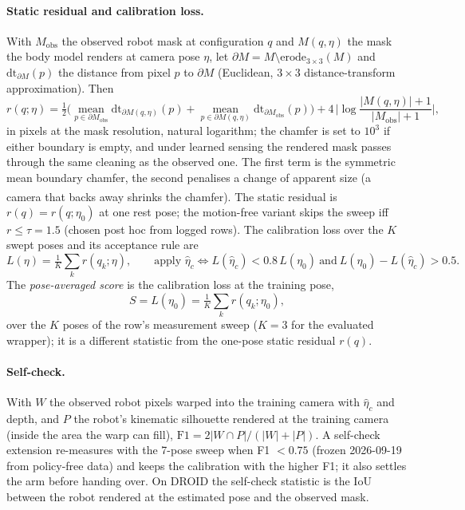 \documentclass{article}
\newcommand{\ph}{\textsuperscript{\dag}}
\begin{document}
\paragraph{Static residual and calibration loss.} With $M_{\mathrm{obs}}$ the observed robot mask at configuration $q$
and $M(q,\eta)$ the mask the body model renders at camera pose $\eta$, let $\partial M = M \setminus
\mathrm{erode}_{3\times3}(M)$ and $\mathrm{dt}_{\partial M}(p)$ the distance from pixel $p$ to $\partial M$ (Euclidean,
$3\times3$ distance-transform approximation). Then
\begin{equation}
r(q;\eta) = \tfrac12\Big( \operatorname*{mean}_{p \in \partial M_{\mathrm{obs}}} \mathrm{dt}_{\partial M(q,\eta)}(p) +
\operatorname*{mean}_{p \in \partial M(q,\eta)} \mathrm{dt}_{\partial M_{\mathrm{obs}}}(p) \Big)
+ 4\,\Big| \log \frac{|M(q,\eta)| + 1}{|M_{\mathrm{obs}}| + 1} \Big|,
\label{eq:resid}
\end{equation}
in pixels at the mask resolution, natural logarithm; the chamfer is set to $10^3$ if either boundary is empty, and under
learned sensing the rendered mask passes through the same cleaning as the observed one. The first term is the symmetric
mean boundary chamfer, the second penalises a change of apparent size (a camera that backs away shrinks the chamfer).
The static residual\ph{} is $r(q) = r(q;\eta_0)$ at one rest pose; the motion-free variant skips the sweep iff $r \le
\tau = 1.5$ (chosen post hoc from logged rows). The calibration loss over the $K$ swept poses and its acceptance rule are
\begin{equation}
L(\eta) = \tfrac1K \textstyle\sum_{k} r(q_k;\eta), \qquad
\text{apply } \hat\eta_c \iff L(\hat\eta_c) < 0.8\,L(\eta_0) \ \text{and}\ L(\eta_0) - L(\hat\eta_c) > 0.5 .
\label{eq:calloss}
\end{equation}
The \emph{pose-averaged score} is the calibration loss at the training pose,
\begin{equation}
S = L(\eta_0) = \tfrac1K \textstyle\sum_{k} r(q_k;\eta_0),
\label{eq:calnom}
\end{equation}
over the $K$ poses of the row's measurement sweep ($K = 3$ for the evaluated wrapper); it is a different statistic from
the one-pose static residual $r(q)$.

\paragraph{Self-check.} With $W$ the observed robot pixels warped into the training camera with $\hat\eta_c$ and depth,
and $P$ the robot's kinematic silhouette rendered at the training camera (inside the area the warp can fill),
$\mathrm{F1} = 2|W\cap P|/(|W| + |P|)$. A self-check extension re-measures with the 7-pose sweep when
F1 $< 0.75$ (frozen 2026-09-19 from policy-free data) and keeps the calibration with the higher F1; it also settles the
arm before handing over. On DROID the self-check statistic is the IoU between the robot rendered at the estimated pose
and the observed mask.
\end{document}
